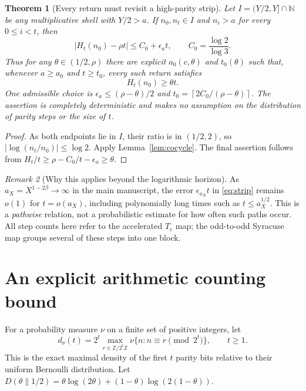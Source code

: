 \documentclass[11pt,a4paper]{article}
\newtheorem{theorem}{Theorem}
\theoremstyle{remark}
\newtheorem{remark}[theorem]{Remark}
\begin{document}
\begin{theorem}[Every return must revisit a high-parity strip]\label{thm:strip}
Let $I=(Y/2,Y]\cap\mathbb N$ be any multiplicative shell with
$Y/2>a$.  If $n_0,n_t\in I$ and $n_i>a$ for every $0\le i<t$, then
\begin{equation}\label{eq:strip}
\boxed{\quad |H_t(n_0)-\rho t|\le
C_0+\epsilon_a t,\qquad C_0=\frac{\log2}{\log3}.\quad}
\end{equation}
Thus for any $\theta\in(1/2,\rho)$ there are explicit
$a_0(c,\theta)$ and $t_0(\theta)$ such that, whenever $a\ge a_0$
and $t\ge t_0$, every such return satisfies
\begin{equation}\label{eq:biased}
\boxed{\quad H_t(n_0)\ge \theta t.\quad}
\end{equation}
One admissible choice is
$\epsilon_a\le(\rho-\theta)/2$ and
$t_0=\left\lceil2C_0/(\rho-\theta)\right\rceil$.
The assertion is completely deterministic and makes no assumption on
the distribution of parity steps or the size of $t$.
\end{theorem}
\begin{proof}
As both endpoints lie in $I$, their ratio is in $(1/2,2)$, so
$|\log(n_t/n_0)|\le\log2$.  Apply Lemma~\ref{lem:cocycle}.
The final assertion follows from
$H_t/t\ge \rho-C_0/t-\epsilon_a\ge\theta$.
\end{proof}

\begin{remark}[Why this applies beyond the logarithmic horizon]
As $a_X=X^{1-2\beta}\to\infty$ in the main manuscript, the error
$\epsilon_{a_X}t$ in \eqref{eq:strip} remains $o(1)$ for
$t=o(a_X)$, including polynomially long times such as
$t\le a_X^{1/2}$.  This is a \emph{pathwise} relation, not a
probabilistic estimate for how often such paths occur.
All step counts here refer to the accelerated $T_c$ map; the odd-to-odd
Syracuse map groups several of these steps into one block.
\end{remark}

\section{An explicit arithmetic counting bound}
For a probability measure $\nu$ on a finite set of positive integers,
let
\[
 d_\nu(t)=2^t\max_{r\in\mathbb Z/2^t\mathbb Z}
  \nu\{n:n\equiv r\pmod{2^t}\},\qquad t\ge1.
\]
This is the exact maximal density of the first $t$ parity bits
relative to their uniform Bernoulli distribution.  Let
$D(\theta\|1/2)=\theta\log(2\theta)
+(1-\theta)\log(2(1-\theta))$.
\end{document}
